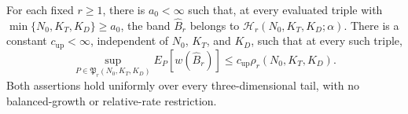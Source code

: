 For each fixed \(r\ge1\), there is \(a_0<\infty\) such that, at every evaluated triple with \(\min\{N_0,K_T,K_D\}\ge a_0\), the band \(\widehat B_r\) belongs to \(\mathcal H_r(N_0,K_T,K_D;\alpha)\). There is a constant \(c_{\mathrm{up}}<\infty\), independent of \(N_0\), \(K_T\), and \(K_D\), such that at every such triple, \[\sup_{P\in\mathfrak P_r(N_0,K_T,K_D)}E_P[w(\widehat B_r)]\le c_{\mathrm{up}}\rho_r(N_0,K_T,K_D).\] Both assertions hold uniformly over every three-dimensional tail, with no balanced-growth or relative-rate restriction.